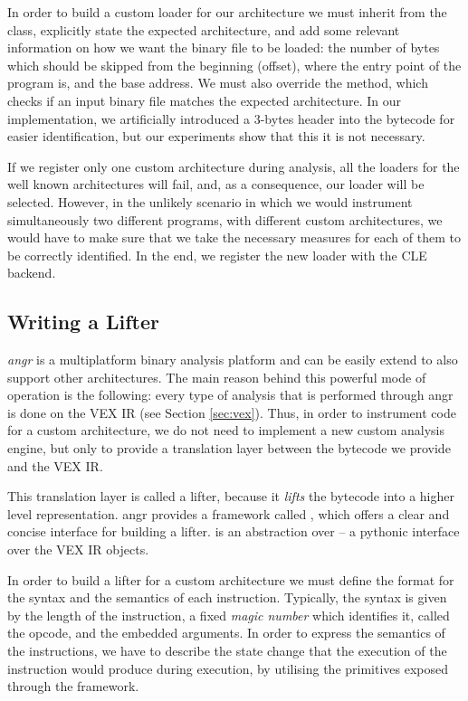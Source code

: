 In order to build a custom loader for our architecture we must inherit from the  class, explicitly state the expected architecture, and add some relevant information on how we want the binary file to be loaded: the number of bytes which should be skipped from the beginning (offset), where the entry point of the program is, and the base address. We must also override the  method, which checks if an input binary file matches the expected architecture. In our implementation, we artificially introduced a 3-bytes header into the bytecode for easier identification, but our experiments show that this it is not necessary. 

If we register only one custom architecture during analysis, all the loaders for the well known architectures will fail, and, as a consequence, our loader will be selected. However, in the unlikely scenario in which we would instrument simultaneously two different programs, with different custom architectures, we would have to make sure that we take the necessary measures for each of them to be correctly identified. In the end, we register the new loader with the \gls{CLE} backend.

\subsection{Writing a Lifter}

\textit{angr} is a multiplatform binary analysis platform and can be easily extend to also support other architectures. The main reason behind this powerful mode of operation is the following: every type of analysis that is performed through angr is done on the VEX \gls{IR} (see Section \ref{sec:vex}). Thus, in order to instrument code for a custom architecture, we do not need to implement a new custom analysis engine, but only to provide a translation layer between the bytecode we provide and the VEX \gls{IR}. 

This translation layer is called a lifter, because it \emph{lifts} the bytecode into a higher level representation. angr provides a framework called , which offers a clear and concise interface for building a lifter.  is an abstraction over  -- a pythonic interface over the VEX \gls{IR} objects.

In order to build a lifter for a custom architecture we must define the format for the syntax and the semantics of each instruction. Typically, the syntax is given by the length of the instruction, a fixed \emph{magic number} which identifies it, called the opcode, and the embedded arguments. In order to express the semantics of the instructions, we have to describe the state change that the execution of the instruction would produce during execution, by utilising the primitives exposed through the  framework. 

